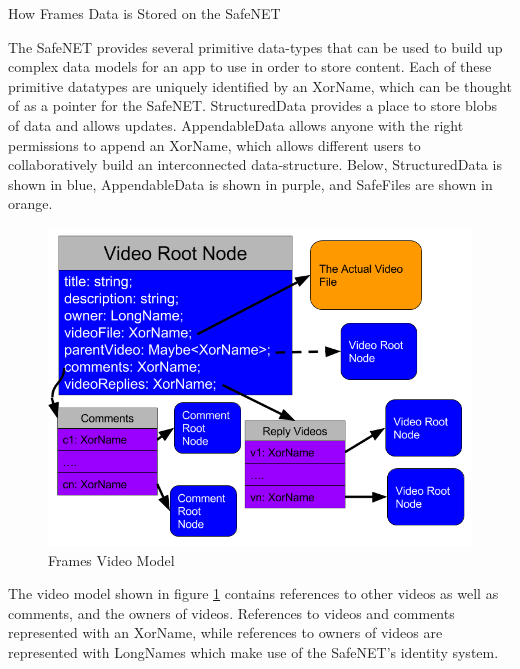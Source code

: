 \documentclass[final]{beamer}
\newlength{\onecolwid}
\newlength{\twocolwid}
\begin{document}
\begin{frame}[t]
\begin{columns}[t]
\begin{column}{\twocolwid}
\begin{columns}[t,totalwidth=\twocolwid]
\begin{column}{\onecolwid}\vspace{-.6in} %


\begin{block}{How Frames Data is Stored on the SafeNET}

  The SafeNET provides several primitive data-types that can be used
  to build up complex data models for an app to use in order to store
  content. Each of these primitive datatypes are uniquely identified by
  an XorName, which can be thought of as a pointer for the SafeNET.
  StructuredData provides a place to store blobs of data and
  allows updates. AppendableData allows anyone with the right permissions
  to append an XorName, which allows different users to collaboratively
  build an interconnected data-structure. Below, StructuredData is shown
  in blue, AppendableData is shown in purple, and SafeFiles are shown in
  orange.

  \begin{figure}
  \includegraphics[width=0.8\linewidth]{video-model.png}
  \caption{Frames Video Model}
  \label{fig:video-model}
  \end{figure}

  The video model shown in figure \ref{fig:video-model} contains references to
  other videos as well as comments, and the owners of videos. References to videos and comments
  represented with an XorName, while references to owners of videos are
  represented with LongNames which make use of the SafeNET's identity system.


\end{block}
\end{column}
\end{columns}
\end{column}
\end{columns}
\end{frame}
\end{document}
